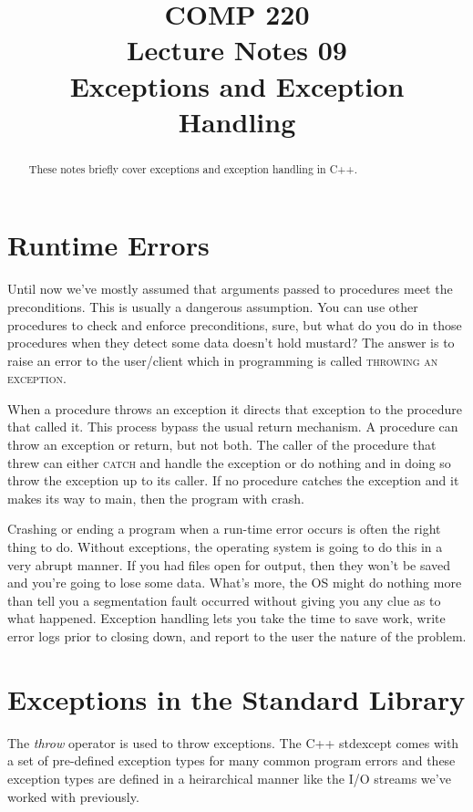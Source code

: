 \documentclass[nobib]{tufte-handout}
\title{COMP 220 \\ Lecture Notes 09 \\ Exceptions and Exception Handling}
\begin{document}
\maketitle

\begin{abstract}
These notes briefly cover exceptions and exception handling in C++.
\end{abstract}

\section{Runtime Errors}

Until now we've mostly assumed that arguments passed to procedures meet the preconditions. This is usually a dangerous assumption. You can use other procedures to check and enforce preconditions, sure, but what do you do in those procedures when they detect some data doesn't hold mustard?  The answer is to raise an error to the user/client which in programming is called \textsc{throwing an exception}.

When a procedure throws an exception it directs that exception to the procedure that called it. This process bypass the usual return mechanism. A procedure can throw an exception or return, but not both. The caller of the procedure that threw can either \textsc{catch} and handle the exception or do nothing and in doing so throw the exception up to its caller. If no procedure catches the exception and it makes its way to main, then the program with crash.

Crashing or ending a program when a run-time error occurs is often the right thing to do.  Without exceptions, the operating system is going to do this in a very abrupt manner. If you had files open for output, then they won't be saved and you're going to lose some data. What's more, the OS might do nothing more than tell you a segmentation fault occurred without giving you any clue as to what happened. Exception handling lets you take the time to save work, write error logs prior to closing down, and report to the user the nature of the problem.

\section{Exceptions in the Standard Library}

The \textit{throw} operator is used to throw exceptions. The C++ stdexcept comes with a set of pre-defined exception types for many common program errors and these exception types are defined in a heirarchical manner like the I/O streams we've worked with previously.
\end{document}
